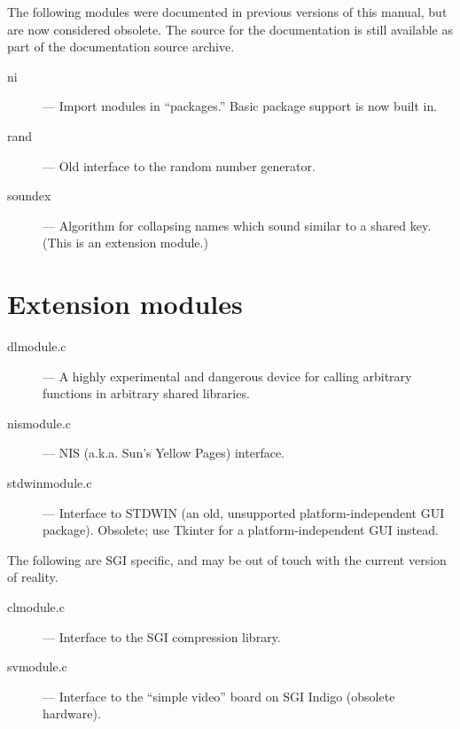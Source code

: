 The following modules were documented in previous versions of this
manual, but are now considered obsolete.  The source for the
documentation is still available as part of the documentation source
archive.

\begin{description}
\item[ni]
--- Import modules in ``packages.''  Basic package support is now
built in.

\item[rand]
--- Old interface to the random number generator.

\item[soundex]
--- Algorithm for collapsing names which sound similar to a shared
key.  (This is an extension module.)
\end{description}


\section{Extension modules}

\begin{description}
\item[dlmodule.c]
---  A highly experimental and dangerous device for calling
arbitrary \C{} functions in arbitrary shared libraries.

\item[nismodule.c]
--- NIS (a.k.a. Sun's Yellow Pages) interface.

\item[stdwinmodule.c]
--- Interface to STDWIN (an old, unsupported
platform-independent GUI package).  Obsolete; use Tkinter for a
platform-independent GUI instead.
\end{description}

The following are SGI specific, and may be out of touch with the
current version of reality.

\begin{description}
\item[clmodule.c]
--- Interface to the SGI compression library.

\item[svmodule.c]
--- Interface to the ``simple video'' board on SGI Indigo
(obsolete hardware).
\end{description}
